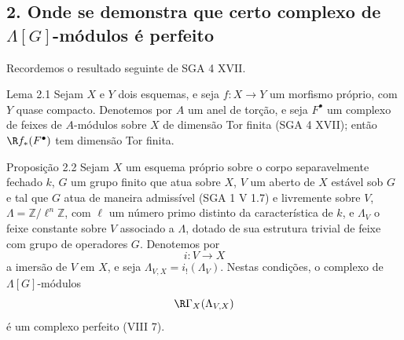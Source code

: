\subsection*{2. Onde se demonstra que certo complexo de $\Lambda[G]$-módulos é perfeito}

Recordemos o resultado seguinte de SGA 4 XVII.

\begin{statement}{Lema 2.1}
Sejam $X$ e $Y$ dois esquemas, e seja $f:X\to Y$ um morfismo próprio, com $Y$ quase compacto. Denotemos por $A$ um anel de torção, e seja $F^\bullet$ um complexo de feixes de $A$-módulos sobre $X$ de dimensão Tor finita (SGA 4 XVII); então $\R f_*(F^\bullet)$ tem dimensão Tor finita.
\end{statement}

\begin{statement}{Proposição 2.2}
Sejam $X$ um esquema próprio sobre o corpo separavelmente fechado $k$, $G$ um grupo finito que atua sobre $X$, $V$ um aberto de $X$ estável sob $G$ e tal que $G$ atua de maneira admissível (SGA 1 V 1.7) e livremente sobre $V$, $\Lambda=\mathbb Z/\ell^n\mathbb Z$, com $\ell$ um número primo distinto da característica de $k$, e $\Lambda_V$ o feixe constante sobre $V$ associado a $\Lambda$, dotado de sua estrutura trivial de feixe com grupo de operadores $G$. Denotemos por
\[
i:V\longrightarrow X
\]
a imersão de $V$ em $X$, e seja $\Lambda_{V,X}=i_!(\Lambda_V)$. Nestas condições, o complexo de $\Lambda[G]$-módulos
\[
\R\Gamma_X(\Lambda_{V,X})
\]
é um complexo perfeito (VIII 7).
\end{statement}
